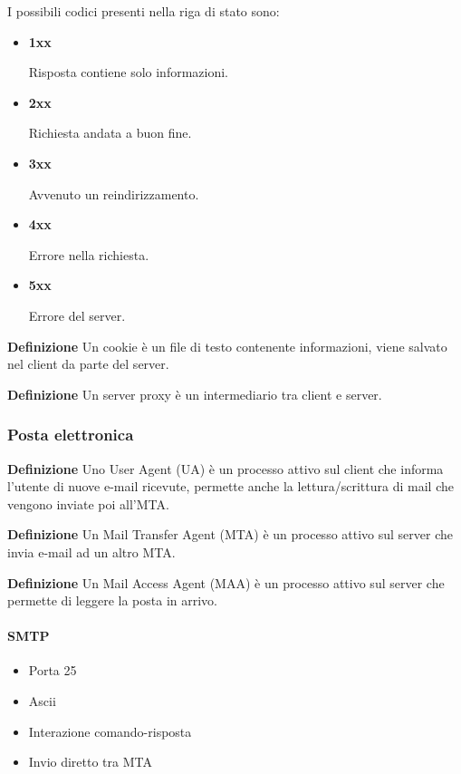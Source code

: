\documentclass{article}
\begin{document}
\noindent I possibili codici presenti nella riga di stato sono:
\begin{itemize}
    \item \textbf{1xx}

        Risposta contiene solo informazioni.
    
    \item \textbf{2xx}

        Richiesta andata a buon fine.
    
    \item \textbf{3xx}

        Avvenuto un reindirizzamento.
    
    \item \textbf{4xx}

        Errore nella richiesta.
    
    \item \textbf{5xx}

        Errore del server.\newline
    
\end{itemize}

\noindent\textbf{Definizione} Un cookie è un file di testo contenente informazioni, viene salvato nel client da parte del server.\newline

\noindent\textbf{Definizione} Un server proxy è un intermediario tra client e server.\newline

\newpage

\subsubsection{Posta elettronica}

\textbf{Definizione} Uno User Agent (UA) è un processo attivo sul client che informa l'utente di nuove e-mail ricevute, permette anche la lettura/scrittura di mail che vengono inviate poi all'MTA.\newline

\noindent\textbf{Definizione} Un Mail Transfer Agent (MTA) è un processo attivo sul server che invia e-mail ad un altro MTA.\newline

\noindent\textbf{Definizione} Un Mail Access Agent (MAA) è un processo attivo sul server che permette di leggere la posta in arrivo.\newline

\paragraph{SMTP}
\begin{itemize}
    \item Porta 25
    \item Ascii
    \item Interazione comando-risposta
    \item Invio diretto tra MTA\newline
\end{itemize}
\end{document}
